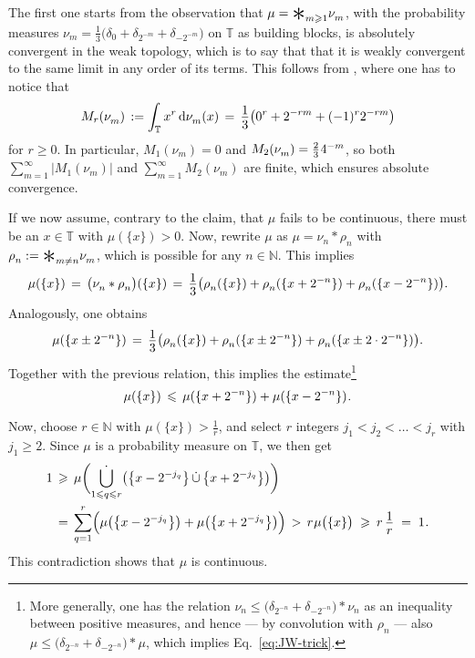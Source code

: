 \documentclass[11pt,a4paper]{amsart}
\theoremstyle{plain}
\theoremstyle{definition}
\numberwithin{equation}{section}
\newcommand{\dd}{\,\mathrm{d}}
\newcommand{\ts}{\hspace{0.5pt}}
\newcommand{\medconv}{\raisebox{-2.5pt}{\mbox{\huge $*$}}}
\newcommand{\NN}{\mathbb{N}}
\newcommand{\TT}{\mathbb{T}}
\newcommand{\myfrac}[2]{\frac{\raisebox{-2pt}{$#1$}}
      {\raisebox{0.5pt}{$#2$}}}
\begin{document}
The first one starts from the observation that
$\mu = \medconv_{m\geqslant 1} \nu^{}_{m}$, with the probability
measures
$\nu^{}_{m} = \frac{1}{3} \bigl( \delta^{}_{0} + \delta^{}_{2^{-m}} +
\delta^{}_{-2^{-m}}\bigr)$
on $\TT$ as building blocks, is absolutely convergent in the weak
topology, which is to say that that it is weakly convergent to the
same limit in any order of its terms.  This follows from
\cite[Thm.~6]{JW}, where one has to notice that
\[
  M_{r} (\nu^{}_{m}) \, := \int_{\TT} x^{r} \dd \nu^{}_{m} (x)
  \, = \, \myfrac{1}{3} \bigl( 0^r + 2^{-rm} + (-1)^{r} 2^{-rm} \bigr) 
\]
for $r\geqslant 0$. In particular, $M_1 (\nu^{}_{m}) = 0$ and
$M_2 (\nu^{}_{m}) = \frac{2}{3}\ts 4^{-m}$, so both
$\sum_{m=1}^{\infty} \lvert M_1 (\nu^{}_{m}) \rvert$ and
$\sum_{m=1}^{\infty} M_2 (\nu^{}_{m})$ are finite, which ensures
absolute convergence.

If we now assume, contrary to the claim, that $\mu$ fails to be
continuous, there must be an $x\in\TT$ with $\mu(\{ x\}) >0$.  Now,
rewrite $\mu$ as $\mu = \nu^{}_{n} * \rho^{}_{n}$ with
$\rho^{}_{n} := \medconv_{m\ne n} \nu^{}_{m}$, which is possible for
any $n\in\NN$. This implies
\[
   \mu (\{ x \}) \, = \, \bigl(\nu^{}_{n} * \rho^{}_{n}\bigr)
   (\{ x \} ) \, = \, \myfrac{1}{3} \bigl( \rho^{}_{n} (\{ x \})
   + \rho^{}_{n} (\{ x + 2^{-n}\}) + \rho^{}_{n} (\{ x - 2^{-n}\})
   \bigr) .
\]
Analogously, one obtains
\[
  \mu (\{ x \pm 2^{-n}\}) \,  = \, \myfrac{1}{3} \bigl( 
  \rho^{}_{n} (\{ x \}) + \rho^{}_{n} (\{ x \pm 2^{-n}\}) 
   + \rho^{}_{n} (\{ x \pm 2 \cdot 2^{-n}\}) \bigr).
\]
Together with the previous relation, this implies the
estimate\footnote{More generally, one has the relation
  $\nu^{}_{n} \leqslant \bigl(\delta^{}_{2^{-n}} +
  \delta^{}_{-2^{-n}}\bigr)*\nu^{}_{n}$
  as an inequality between positive measures, and hence --- by
  convolution with $\rho^{}_{n}$ --- also
  $\mu \leqslant \bigl(\delta^{}_{2^{-n}} + \delta^{}_{-2^{-n}}
  \bigr)* \mu$, which implies Eq.~\eqref{eq:JW-trick}. }
\begin{equation}\label{eq:JW-trick}
   \mu(\{x\}) \, \leqslant \, \mu (\{ x + 2^{-n}\})
   + \mu (\{ x - 2^{-n}\}) \ts .
\end{equation}

Now, choose $r\in\NN$ with $\mu(\{x\}) > \frac{1}{r}$, and select
$r$ integers $j^{}_{1} < j^{}_{2} < \ldots < j^{}_{r}$ with $j^{}_{1}
\geqslant 2$. Since $\mu$ is a probability measure on $\TT$, we
then get
\[
\begin{split}
  1 \, & \geqslant \, \mu  \biggl( 
   \dot{\bigcup_{1\leqslant  q\leqslant  r}} \bigl(
     \big\{x-2^{- j_q} \big\}\, \dot{\cup}\,
     \big\{x+2^{- j_q} \big\}\bigr) \biggr) \\
    & = \, \sum_{q=1}^r \Bigl( \mu \bigl(  
     \big\{x-2^{- j_q} \big\}\bigr) +
     \mu \bigl( \big\{x+2^{- j_q} \big\} \bigr)  
     \Bigr)  \,  > \, r \ts \mu \bigl(\{x\}\bigr) 
    \; \geqslant \: r \, \myfrac{1}{r} \; = \; 1 \ts .
\end{split}
\]
This contradiction shows that $\mu$ is continuous. \smallskip
\end{document}
